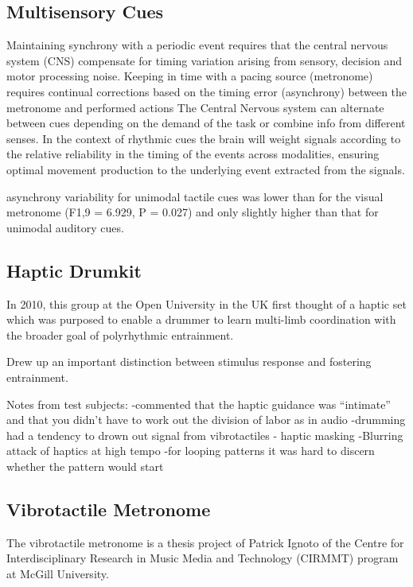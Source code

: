 \subsection{Multisensory Cues}
Maintaining synchrony with a periodic event requires that the central nervous system (CNS) compensate for timing variation arising from sensory, decision and motor processing noise. 
Keeping in time with a pacing source (metronome) requires continual corrections based on the timing error (asynchrony) between the metronome and performed actions
The Central Nervous system can alternate between cues depending on the demand of the task or combine info from different senses. In the context of rhythmic cues the brain will weight signals according to the relative reliability in the timing of the events across modalities, ensuring optimal movement production to the underlying event extracted from the signals. 

asynchrony variability for unimodal tactile cues was lower than for the visual metronome (F1,9 = 6.929, P = 0.027) and only slightly higher than that for unimodal auditory cues. \cite{elliott2010multisensory}

\subsection{Haptic Drumkit}
In 2010, this group at the Open University in the UK first thought of a haptic set which was purposed to enable a drummer to learn multi-limb coordination with the broader goal of polyrhythmic entrainment.

Drew up an important distinction between stimulus response and fostering entrainment.

Notes from test subjects:
	-commented that the haptic guidance was “intimate” and that you didn’t have to work out the division of labor as in audio
	-drumming had a tendency to drown out signal from vibrotactiles - haptic masking
	-Blurring attack of haptics at high tempo
    -for looping patterns it was hard to discern whether the pattern would start
\cite{holland2010feeling}

\subsection{Vibrotactile Metronome} \label{vibrotactileMetronome}
\cite{ignoto2017development}
The vibrotactile metronome is a thesis project of Patrick Ignoto of the Centre for Interdisciplinary Research in Music Media and Technology (CIRMMT) program at McGill University.

